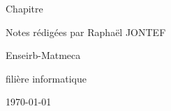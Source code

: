 \documentclass[12pt]{article}
\begin{document}



\hypersetup{pageanchor=false}
\setlength{\headheight}{15pt}
\begin{titlepage}
    \centering
    \vspace*{3cm}
    {\huge Chapitre \numeroChapitre\par}
    {\Huge \bfseries\texteNomChapitre \par} %
    \vspace{2cm}
    {\Large Notes rédigées par Raphaël JONTEF\par}
    \vspace{0.5cm}
    {\normalsize \texteNomProf \par}
    \vspace{4cm}
    {\small Enseirb-Matmeca\par}
    {\small filière informatique\par}
    \vfill
    {\large \today\par}
\end{titlepage}
\hypersetup{pageanchor=true} %

\tableofcontents
\newpage



% 
% 
% 
\end{document}
